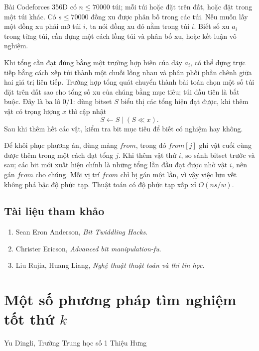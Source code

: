 \documentclass[11pt]{article}
\begin{document}
Bài Codeforces 356D có \(n\le70000\) túi; mỗi túi hoặc đặt trên đất, hoặc đặt
trong một túi khác. Có \(s\le70000\) đồng xu được phân bố trong các túi. Nếu
muốn lấy một đồng xu phải mở túi \(i\), ta nói đồng xu đó nằm trong túi \(i\).
Biết số xu \(a_i\) trong từng túi, cần dựng một cách lồng túi và phân bố xu,
hoặc kết luận vô nghiệm.

Khi tổng cần đạt đúng bằng một trường hợp biên của dãy \(a_i\), có thể dựng
trực tiếp bằng cách xếp túi thành một chuỗi lồng nhau và phân phối phần chênh
giữa hai giá trị liên tiếp. Trường hợp tổng quát chuyển thành bài toán chọn một
số túi đặt trên đất sao cho tổng số xu của chúng bằng mục tiêu; túi đầu tiên là
bắt buộc. Đây là ba lô 0/1: dùng bitset \(S\) biểu thị các tổng hiện đạt được,
khi thêm vật có trọng lượng \(x\) thì cập nhật
\[
  S\leftarrow S\;|\;(S\ll x).
\]
Sau khi thêm hết các vật, kiểm tra bit mục tiêu để biết có nghiệm hay không.

Để khôi phục phương án, dùng mảng \(\mathit{from}\), trong đó
\(\mathit{from}[j]\) ghi vật cuối cùng được thêm trong một cách đạt tổng \(j\).
Khi thêm vật thứ \(i\), so sánh bitset trước và sau; các bit mới xuất hiện
chính là những tổng lần đầu đạt được nhờ vật \(i\), nên gán \(\mathit{from}\)
cho chúng. Mỗi vị trí \(\mathit{from}\) chỉ bị gán một lần, vì vậy việc lưu
vết không phá bậc độ phức tạp. Thuật toán có độ phức tạp xấp xỉ
\(O(ns/w)\).

\subsection{Tài liệu tham khảo}

\begin{enumerate}
  \item Sean Eron Anderson, \emph{Bit Twiddling Hacks}.
  \item Christer Ericson, \emph{Advanced bit manipulation-fu}.
  \item Liu Rujia, Huang Liang, \emph{Nghệ thuật thuật toán và thi tin học}.
\end{enumerate}

\section{Một số phương pháp tìm nghiệm tốt thứ \texorpdfstring{\(k\)}{k}}

\begin{center}
Yu Dingli, Trường Trung học số 1 Thiệu Hưng
\end{center}
\end{document}
